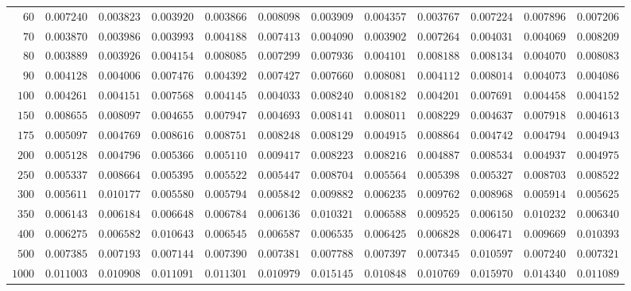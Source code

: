\begin{sidewaystable}
\begin{tabular}{r|rrrrrrrrrrr}
$60$ & $0.007240$ & $0.003823$ & $0.003920$ & $0.003866$ & $0.008098$ & $0.003909$ & $0.004357$ & $0.003767$ & $0.007224$ & $0.007896$ & $0.007206$ \\
$70$ & $0.003870$ & $0.003986$ & $0.003993$ & $0.004188$ & $0.007413$ & $0.004090$ & $0.003902$ & $0.007264$ & $0.004031$ & $0.004069$ & $0.008209$ \\
$80$ & $0.003889$ & $0.003926$ & $0.004154$ & $0.008085$ & $0.007299$ & $0.007936$ & $0.004101$ & $0.008188$ & $0.008134$ & $0.004070$ & $0.008083$ \\
$90$ & $0.004128$ & $0.004006$ & $0.007476$ & $0.004392$ & $0.007427$ & $0.007660$ & $0.008081$ & $0.004112$ & $0.008014$ & $0.004073$ & $0.004086$ \\
$100$ & $0.004261$ & $0.004151$ & $0.007568$ & $0.004145$ & $0.004033$ & $0.008240$ & $0.008182$ & $0.004201$ & $0.007691$ & $0.004458$ & $0.004152$ \\
$150$ & $0.008655$ & $0.008097$ & $0.004655$ & $0.007947$ & $0.004693$ & $0.008141$ & $0.008011$ & $0.008229$ & $0.004637$ & $0.007918$ & $0.004613$ \\
$175$ & $0.005097$ & $0.004769$ & $0.008616$ & $0.008751$ & $0.008248$ & $0.008129$ & $0.004915$ & $0.008864$ & $0.004742$ & $0.004794$ & $0.004943$ \\
$200$ & $0.005128$ & $0.004796$ & $0.005366$ & $0.005110$ & $0.009417$ & $0.008223$ & $0.008216$ & $0.004887$ & $0.008534$ & $0.004937$ & $0.004975$ \\
$250$ & $0.005337$ & $0.008664$ & $0.005395$ & $0.005522$ & $0.005447$ & $0.008704$ & $0.005564$ & $0.005398$ & $0.005327$ & $0.008703$ & $0.008522$ \\
$300$ & $0.005611$ & $0.010177$ & $0.005580$ & $0.005794$ & $0.005842$ & $0.009882$ & $0.006235$ & $0.009762$ & $0.008968$ & $0.005914$ & $0.005625$ \\
$350$ & $0.006143$ & $0.006184$ & $0.006648$ & $0.006784$ & $0.006136$ & $0.010321$ & $0.006588$ & $0.009525$ & $0.006150$ & $0.010232$ & $0.006340$ \\
$400$ & $0.006275$ & $0.006582$ & $0.010643$ & $0.006545$ & $0.006587$ & $0.006535$ & $0.006425$ & $0.006828$ & $0.006471$ & $0.009669$ & $0.010393$ \\
$500$ & $0.007385$ & $0.007193$ & $0.007144$ & $0.007390$ & $0.007381$ & $0.007788$ & $0.007397$ & $0.007345$ & $0.010597$ & $0.007240$ & $0.007321$ \\
$1000$ & $0.011003$ & $0.010908$ & $0.011091$ & $0.011301$ & $0.010979$ & $0.015145$ & $0.010848$ & $0.010769$ & $0.015970$ & $0.014340$ & $0.011089$ \\
\hline
\end{tabular}
\end{sidewaystable}
 
